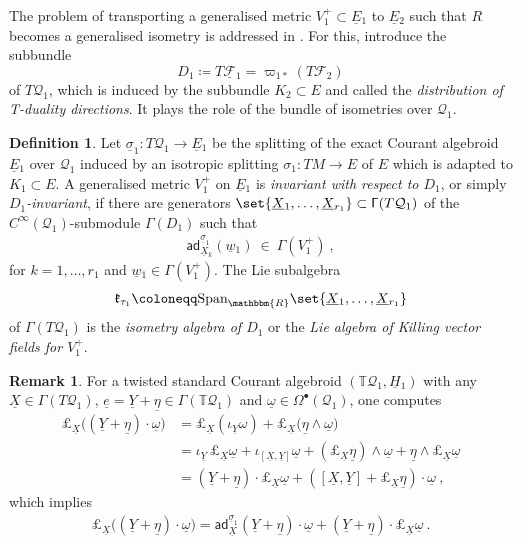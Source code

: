 \documentclass[a4paper, reqno, 11pt]{amsart}
\numberwithin{equation}{section}
\theoremstyle{definition}
\newtheorem{definition}[equation]{Definition}
\newtheorem{remark}[equation]{Remark}
\newcommand{\sfgamma}{\mathsf{\Gamma}}
\newcommand{\red}[1]{\underline{#1}}
\newcommand{\frk}[1]{\mathfrak{#1}}
\newcommand{\IR}{\mathbbm{R}}
\newcommand{\IT}{\mathbb{T}}
\newcommand{\cQ}{{\mathcal Q}}
\newcommand{\cF}{{\mathcal F}}
\newcommand{\sfGamma}{{\mathsf{\Gamma}}}
\newcommand{\sfOmega}{{\mathsf{\Omega}}}
\newcommand{\ad}{\mathsf{ad}}
\theoremstyle{remark}
\begin{document}
The problem of transporting a generalised metric $ V_1^+ \subset \red E{}_1$ to $\red E{}_2$ such that $R$ becomes a generalised isometry is addressed in \cite{DeFraja:2023fhe}. 
For this, introduce the subbundle $$D_1 \coloneqq T {\red\cF}{}_1 = \varpi_{1*}(T \cF_2)$$ of $T\cQ_1$, which is induced by the subbundle $K_2 \subset E$ and called the \emph{distribution of T-duality directions}.
It plays the role of the bundle of isometries over $\cQ_1$.

\begin{definition} \label{def:D1invariance}
    Let $\red \sigma_1 \colon T\cQ_1 \to \red E{}_1 $ be the splitting of the exact Courant algebroid $\red E{}_1$ over $\cQ_1$ induced by an isotropic  splitting $\sigma_1 \colon TM \to E$ of $E$ which is adapted to $K_1\subset E$.   
    A generalised metric $V_1^+$ on $\red E{}_1$ is \emph{invariant with respect to $D_1$}, or simply \emph{$D_1$-invariant}, if there are generators $\set{\red X{}_1,\dots, \red X{}_{r_1}}\subset \sfgamma(T\cQ_1)$ of the $C^\infty(\cQ_1)$-submodule $\sfgamma(D_1)$ such that
    \begin{align}\label{eqn:genmetricinvariance}
        \ad^{\red \sigma_1}_{\red X{}_k} (\red w{}_1 ) \ \in \ \mathsf{\Gamma}(V_1^+) \ ,
    \end{align}
    for $k=1,\dots,r_1$ and $\red w{}_1\in \mathsf{\Gamma}(V_1^+)$. The Lie subalgebra $$\frk{k}_{\tau_1} \coloneqq \text{Span}_{\IR}\set{\red X{}_1,\dots, \red X{}_{r_1}}$$ of $\sfgamma(T\cQ_1)$ is the \emph{isometry algebra of $D_1$} or the \emph{Lie algebra of Killing vector fields for $V_1^+$}.
\end{definition}

\begin{remark}
    For a twisted standard Courant algebroid $(\IT \cQ_1, \red H{}_1)$ with any $ \red X\in \sfGamma(T\cQ_1)$, $\red e = \red Y+\red \eta \in \sfgamma(\IT \cQ_1)$ and $ \red \omega \in \sfOmega^\bullet(\cQ_1)$, one computes
    \begin{align}
        \pounds_{\red X} \big( (\red Y+\red \eta) \cdot \red \omega\big) &= \pounds_{\red X} (\iota_{\red Y} \omega) + \pounds_{\red X}(\red \eta \wedge \red \omega\big)\\[4pt]
        &= \iota_{\red Y}\, \pounds_{\red X}\red  \omega + \iota_{[\red X,\red Y]} \red \omega + (\pounds_{\red X}\red  \eta) \wedge \red \omega + \red \eta \wedge \pounds_{\red X}\red \omega\\[4pt]
        &=(\red Y+\red \eta)\cdot \pounds_{\red X}\red  \omega + ([\red X,\red Y] + \pounds_{\red X}\red  \eta) \cdot \red \omega \ ,
    \end{align}
which implies
\begin{align}\label{eqn:spinorLeibnizrule}
        \pounds_{\red X} \big( (\red Y+\red \eta) \cdot \red \omega\big) = \ad_{\red X}^{\red \sigma_1}(\red Y+\red \eta) \cdot \red \omega + (\red Y+\red \eta)\cdot \pounds_{\red X}\red  \omega \ .
    \end{align}
\end{remark}
\end{document}
